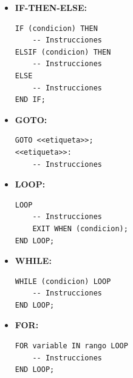 \documentclass{templateNote}
\begin{document}
\begin{itemize}
    \item \textbf{IF-THEN-ELSE:}
    \begin{tcolorbox}[
        colframe=Salmon!100, %
        colback=Salmon!20,       %
        coltitle=black!100, %
        title=\textbf{PL/SQL}, %
    ]
        \begin{Verbatim}[breaklines=true]
IF (condicion) THEN
    -- Instrucciones
ELSIF (condicion) THEN
    -- Instrucciones
ELSE
    -- Instrucciones
END IF;
        \end{Verbatim}
    \end{tcolorbox}

    \item \textbf{GOTO:}
    \begin{tcolorbox}[
        colframe=Salmon!100, %
        colback=Salmon!20,       %
        coltitle=black!100, %
        title=\textbf{PL/SQL}, %
    ]
    \begin{Verbatim}[breaklines=true]
GOTO <<etiqueta>>;
<<etiqueta>>:
    -- Instrucciones
        \end{Verbatim}
    \end{tcolorbox}

    \item \textbf{LOOP:}
    \begin{tcolorbox}[
        colframe=Salmon!100, %
        colback=Salmon!20,       %
        coltitle=black!100, %
        title=\textbf{PL/SQL}, %
    ]
        \begin{Verbatim}[breaklines=true]
LOOP
    -- Instrucciones
    EXIT WHEN (condicion);
END LOOP;
        \end{Verbatim}
    \end{tcolorbox}

    \item \textbf{WHILE:}
    \begin{tcolorbox}[
        colframe=Salmon!100, %
        colback=Salmon!20,       %
        coltitle=black!100, %
        title=\textbf{PL/SQL}, %
    ]
        \begin{Verbatim}[breaklines=true]
WHILE (condicion) LOOP
    -- Instrucciones
END LOOP;
        \end{Verbatim}
    \end{tcolorbox}

    \item \textbf{FOR:}
    \begin{tcolorbox}[
        colframe=Salmon!100, %
        colback=Salmon!20,       %
        coltitle=black!100, %
        title=\textbf{PL/SQL}, %
    ]
        \begin{Verbatim}[breaklines=true]
FOR variable IN rango LOOP
    -- Instrucciones
END LOOP;
        \end{Verbatim}
    \end{tcolorbox}
\end{itemize}
\end{document}

